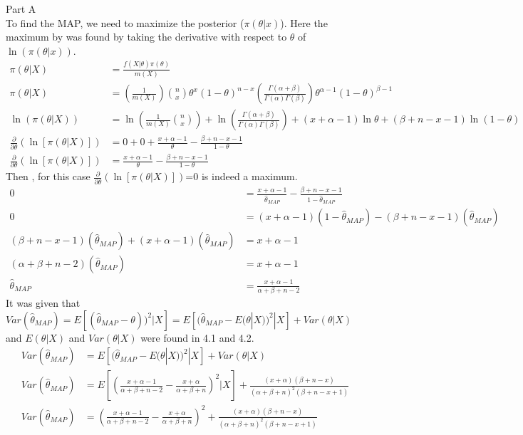 \documentclass[11pt]{article}
\begin{document}
\item %
Part A \\
To find the MAP, we need to maximize the posterior ($\pi(\theta|x)$). Here the maximum by was found by taking the derivative with respect to $\theta$ of $\ln (\pi(\theta|x))$.  
\begin{align*}
\pi(\theta|X) &=\frac{ f(X| \theta) \pi (\theta)}{m(X)} \\
\pi(\theta|X) &=\left(\frac{1}{m(X)} \right)  {n \choose x} \theta^{x} (1-\theta)^{n-x} \left( \frac{\Gamma (\alpha + \beta)}{\Gamma(\alpha)\Gamma(\beta)} \right) \theta^{\alpha-1}(1-\theta)^{\beta-1} \\
\ln (\pi(\theta|X)) &= \ln \left(\frac{1}{m(X)}{n \choose x} \right)+\ln \left( \frac{\Gamma (\alpha + \beta)}{\Gamma(\alpha)\Gamma(\beta)} \right) +(x+\alpha-1) \ln \theta +(\beta+n-x-1) \ln(1-\theta) \\
\frac{\partial}{\partial \theta} \left( \ln [\pi(\theta|X)] \right) &= 0+0+\frac{x+\alpha-1}{\theta}-\frac{\beta+n-x-1}{1-\theta} \\
\frac{\partial}{\partial \theta} \left( \ln [\pi(\theta|X)] \right) &=\frac{x+\alpha-1}{\theta}-\frac{\beta+n-x-1}{1-\theta}
\end{align*}
Then , for this case $\frac{\partial}{\partial \theta} \left( \ln [\pi(\theta|X)] \right)$=0 is indeed a maximum.  
\begin{align*}
0 &=\frac{x+\alpha-1}{\hat{\theta}_{MAP}}-\frac{\beta+n-x-1}{1-\hat{\theta}_{MAP}} \\
0 &=(x+\alpha-1)(1-\hat{\theta}_{MAP})-(\beta+n-x-1)(\hat{\theta}_{MAP}) \\
(\beta+n-x-1)(\hat{\theta}_{MAP})+(x+\alpha-1)(\hat{\theta}_{MAP}) &= x+\alpha-1 \\
(\alpha+\beta+n-2)(\hat{\theta}_{MAP}) &= x+\alpha-1 \\
\hat{\theta}_{MAP} &= \frac{x+\alpha-1}{\alpha+\beta+n-2} 
\end{align*}
It was given that $Var(\hat{\theta}_{MAP})=E[(\hat{\theta}_{MAP}-\theta))^2|X]=E[(\hat{\theta}_{MAP}-E(\theta|X))^2|X]+Var(\theta|X)$ and $E(\theta|X)$ and $Var(\theta|X)$ were found in 4.1 and 4.2. 
\begin{align*}
Var(\hat{\theta}_{MAP}) &= E\left[(\hat{\theta}_{MAP}-E(\theta|X))^2|X\right]+Var\left(\theta|X\right) \\
Var(\hat{\theta}_{MAP}) &= E\left[\left(\frac{x+\alpha-1}{\alpha+\beta+n-2} -\frac{x+ \alpha}{\alpha+\beta+n}\right)^2|X\right]+\frac{(x+ \alpha)(\beta+n-x)}{(\alpha+\beta+n)^2(\beta+n-x+1)} \\
Var(\hat{\theta}_{MAP}) &= \left(\frac{x+\alpha-1}{\alpha+\beta+n-2} -\frac{x+ \alpha}{\alpha+\beta+n}\right)^2+\frac{(x+ \alpha)(\beta+n-x)}{(\alpha+\beta+n)^2(\beta+n-x+1)}
\end{align*}
\end{document}
